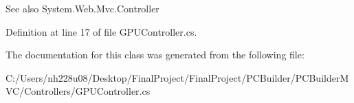 \begin{DoxySeeAlso}{See also}
System.\+Web.\+Mvc.\+Controller


\end{DoxySeeAlso}


Definition at line 17 of file G\+P\+U\+Controller.\+cs.



The documentation for this class was generated from the following file\+:\begin{DoxyCompactItemize}
\item 
C\+:/\+Users/nh228u08/\+Desktop/\+Final\+Project/\+Final\+Project/\+P\+C\+Builder/\+P\+C\+Builder\+M\+V\+C/\+Controllers/G\+P\+U\+Controller.\+cs\end{DoxyCompactItemize}
